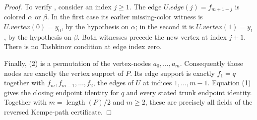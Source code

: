 \begin{proof}
To verify , consider an index $j\geq1$.
The edge $U.edge(j)=f_{m+1-j}$ is colored $\alpha$ or $\beta$.  In the
first case its earlier missing-color witness is $U.vertex(0)=y_0$, by the
hypothesis on $\alpha$; in the second it is
$U.vertex(1)=y_1$, by the hypothesis on $\beta$.  Both witnesses precede
the new vertex at index $j+1$.  There is no Tashkinov condition at edge
index zero.

Finally, (2) is a permutation of the vertex-nodes
$a_0,\ldots,a_m$.  Consequently those nodes are exactly the vertex support
of $P$.  Its edge support is exactly $f_1=q$ together with
$f_m,f_{m-1},\ldots,f_2$, the edges of $U$ at indices $1,\ldots,m-1$.
Equation (1) gives the closing endpoint identity for $q$ and every stated
trunk endpoint identity.  Together with $m=\operatorname{length}(P)/2$
and $m\geq2$, these are precisely all fields of the reversed Kempe-path
certificate.
\end{proof}

